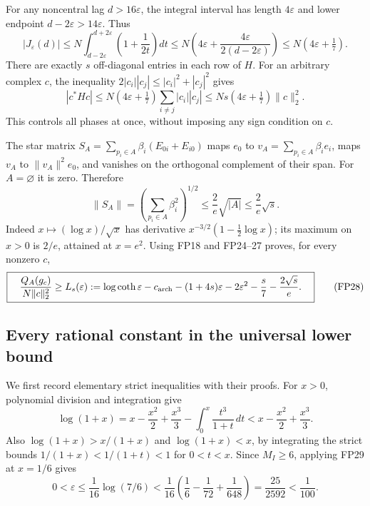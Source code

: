 For any noncentral lag \(d>16\varepsilon\), the integral interval has
length \(4\varepsilon\) and lower endpoint \(d-2\varepsilon>14\varepsilon\). Thus
\[
 |J_\varepsilon(d)|\le
 N\int_{d-2\varepsilon}^{d+2\varepsilon}\left(1+\frac1{2t}\right)dt
 \le N\left(4\varepsilon+\frac{4\varepsilon}{2(d-2\varepsilon)}\right)
 \le N(4\varepsilon+\tfrac17).
 \tag{FP25}\label{fp:fpb:J-bound}
\]
There are exactly \(s\) off-diagonal entries in each row of \(H\).
For an arbitrary complex \(c\), the inequality
\(2|c_i||c_j|\le|c_i|^2+|c_j|^2\) gives
\[
 |c^*Hc|\le
 N(4\varepsilon+\tfrac17)\sum_{i\ne j}|c_i||c_j|
 \le Ns(4\varepsilon+\tfrac17)\|c\|_2^2 .
 \tag{FP26}
\]
This controls all phases at once, without imposing any sign
condition on \(c\).

The star matrix
\(S_A=\sum_{p_i\in A}\beta_i(E_{0i}+E_{i0})\)
maps \(e_0\) to \(v_A=\sum_{p_i\in A}\beta_i e_i\), maps \(v_A\)
to \(\|v_A\|^2e_0\), and vanishes on the orthogonal complement
of their span. For \(A=\varnothing\) it is zero. Therefore
\[
 \|S_A\|=\left(\sum_{p_i\in A}\beta_i^2\right)^{1/2}
 \le \frac2e\sqrt{|A|}\le\frac2e\sqrt s .
 \tag{FP27}\label{fp:fpb:star}
\]
Indeed \(x\mapsto(\log x)/\sqrt x\) has derivative
\(x^{-3/2}(1-\tfrac12\log x)\); its maximum on \(x>0\) is
\(2/e\), attained at \(x=e^2\).
Using FP18 and FP24--27 proves, for every nonzero \(c\),
\[
 \boxed{\quad
 \frac{Q_A(g_c)}{N\|c\|_2^2}\ge
 L_s(\varepsilon):=
 \log\coth\varepsilon-c_{\rm arch}
 -(1+4s)\varepsilon-2\varepsilon^2-\frac s7-\frac{2\sqrt s}{e}.
 \quad}
 \tag{FP28}\label{fp:fpb:uniform}
\]

\subsection{Every rational constant in the universal lower bound}

We first record elementary strict inequalities with their proofs.
For \(x>0\), polynomial division and integration give
\[
 \log(1+x)
 =x-\frac{x^2}{2}+\frac{x^3}{3}
       -\int_0^x\frac{t^3}{1+t}\,dt
 <x-\frac{x^2}{2}+\frac{x^3}{3}.
 \tag{FP29}\label{fp:fpb:log-upper}
\]
Also
\(\log(1+x)>x/(1+x)\) and \(\log(1+x)<x\), by integrating
the strict bounds \(1/(1+x)<1/(1+t)<1\) for \(0<t<x\).
Since \(M_I\ge6\), applying FP29 at \(x=1/6\) gives
\[
 0<\varepsilon\le\frac1{16}\log(7/6)
 <\frac1{16}\left(\frac16-\frac1{72}+\frac1{648}\right)
 =\frac{25}{2592}<\frac1{100}.
 \tag{FP30}\label{fp:fpb:eps-bound}
\]

